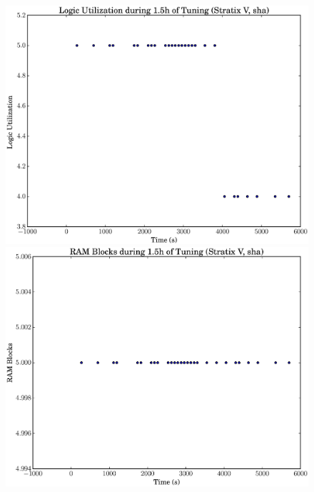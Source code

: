 \documentclass[12pt, a4paper]{article}
\begin{document}
\begin{figure}[htpb]
    \centering
    \noindent
    \begin{minipage}{.48\textwidth}
        \centering
        \includegraphics[scale=.25]{sha_lu_5400_chstone_StratixV}
    \end{minipage}%
    \hfill
    \begin{minipage}{.48\textwidth}
        \centering
        \includegraphics[scale=.25]{sha_ram_5400_chstone_StratixV}
    \end{minipage}%


\end{figure}
\end{document}
